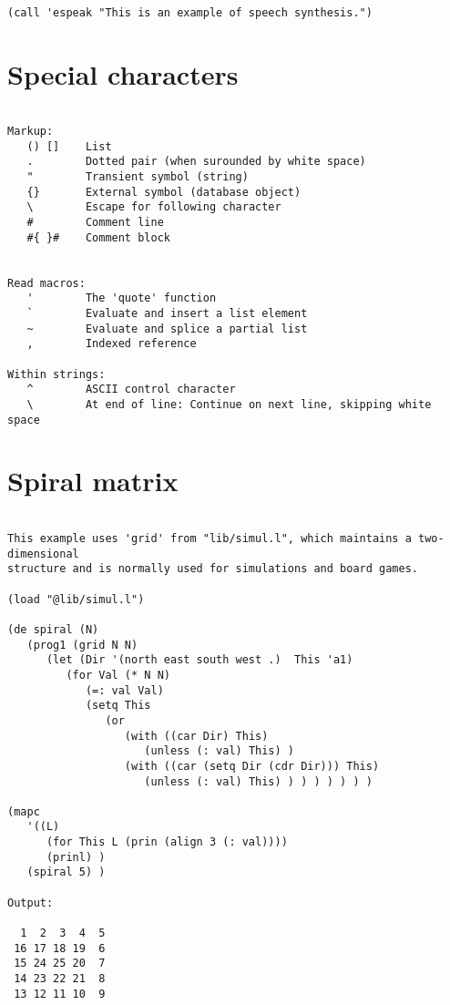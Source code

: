 \begin{verbatim}

(call 'espeak "This is an example of speech synthesis.")

\end{verbatim}

\section*{Special characters}

\begin{verbatim}

Markup:
   () []    List
   .        Dotted pair (when surounded by white space)
   "        Transient symbol (string)
   {}       External symbol (database object)
   \        Escape for following character
   #        Comment line
   #{ }#    Comment block


Read macros:
   '        The 'quote' function
   `        Evaluate and insert a list element
   ~        Evaluate and splice a partial list
   ,        Indexed reference

Within strings:
   ^        ASCII control character
   \        At end of line: Continue on next line, skipping white space

\end{verbatim}

\section*{Spiral matrix}

\begin{verbatim}

This example uses 'grid' from "lib/simul.l", which maintains a two-dimensional
structure and is normally used for simulations and board games.

(load "@lib/simul.l")

(de spiral (N)
   (prog1 (grid N N)
      (let (Dir '(north east south west .)  This 'a1)
         (for Val (* N N)
            (=: val Val)
            (setq This
               (or
                  (with ((car Dir) This)
                     (unless (: val) This) )
                  (with ((car (setq Dir (cdr Dir))) This)
                     (unless (: val) This) ) ) ) ) ) ) )

(mapc
   '((L)
      (for This L (prin (align 3 (: val))))
      (prinl) )
   (spiral 5) )

Output:

  1  2  3  4  5
 16 17 18 19  6
 15 24 25 20  7
 14 23 22 21  8
 13 12 11 10  9

\end{verbatim}

